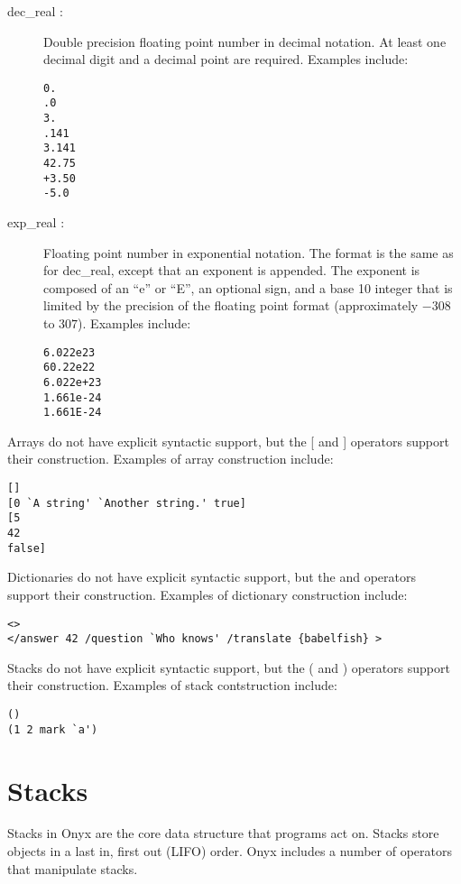 \begin{description}
\item[{\lt}dec\_real{\gt} : ] Double precision floating point number in decimal
notation.  At least one decimal digit and a decimal point are required.
Examples include:
\begin{verbatim}
0.
.0
3.
.141
3.141
42.75
+3.50
-5.0
\end{verbatim}

\item[{\lt}exp\_real{\gt} : ] Floating point number in exponential notation.
The format is the same as for {\lt}dec\_real{\gt}, except that an exponent is
appended.  The exponent is composed of an ``e'' or ``E'', an optional sign, and
a base 10 integer that is limited by the precision of the floating point format
(approximately $-308$ to $307$).  Examples include:
\begin{verbatim}
6.022e23
60.22e22
6.022e+23
1.661e-24
1.661E-24
\end{verbatim}

\end{description}

Arrays do not have explicit syntactic support, but the [ and ] operators support
their construction.  Examples of array construction include:
\begin{verbatim}
[]
[0 `A string' `Another string.' true]
[5
42
false]
\end{verbatim}

Dictionaries do not have explicit syntactic support, but the {\lt} and
{\gt} operators support their construction.  Examples of dictionary
construction include:
\begin{verbatim}
<>
</answer 42 /question `Who knows' /translate {babelfish} >
\end{verbatim}

Stacks do not have explicit syntactic support, but the ( and ) operators support
their construction.  Examples of stack contstruction include:
\begin{verbatim}
()
(1 2 mark `a')
\end{verbatim}

\section{Stacks}

Stacks in Onyx are the core data structure that programs act on.  Stacks store
objects in a last in, first out (LIFO) order.  Onyx includes a number of
operators that manipulate stacks.

